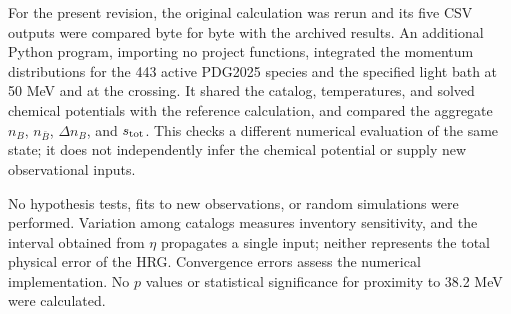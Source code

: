 For the present revision, the original calculation was rerun and its five CSV outputs were compared byte for byte with the archived results. An additional Python program, importing no project functions, integrated the momentum distributions for the 443 active PDG2025 species and the specified light bath at 50 MeV and at the crossing. It shared the catalog, temperatures, and solved chemical potentials with the reference calculation, and compared the aggregate $n_B$, $n_{\bar B}$, $\Delta n_B$, and $s_{\rm tot}$. This checks a different numerical evaluation of the same state; it does not independently infer the chemical potential or supply new observational inputs.

No hypothesis tests, fits to new observations, or random simulations were performed. Variation among catalogs measures inventory sensitivity, and the interval obtained from $\eta$ propagates a single input; neither represents the total physical error of the HRG. Convergence errors assess the numerical implementation. No $p$ values or statistical significance for proximity to 38.2 MeV were calculated.
